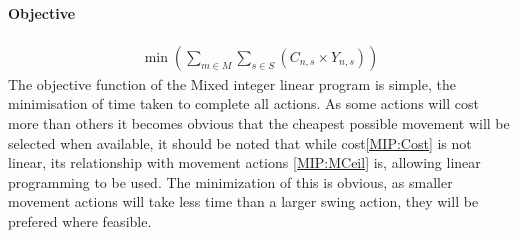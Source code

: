 \paragraph*{Objective}
\begin{align}
\label{MIP:OBJ}
\min\left(\sum_{m\in M}\sum_{s\in S} (C_{n,s}\times Y_{n,s})\right)
\end{align}
The objective function of the Mixed integer linear program is simple, the minimisation of time taken to complete all actions. As some actions will cost more than others it becomes obvious that the cheapest possible movement will be selected when available, it should be noted that while cost\ref{MIP:Cost} is not linear, its relationship with movement actions \ref{MIP:MCeil} is, allowing linear programming to be used. The minimization of this is obvious, as smaller movement actions will take less time than a larger swing action, they will be prefered where feasible. 
